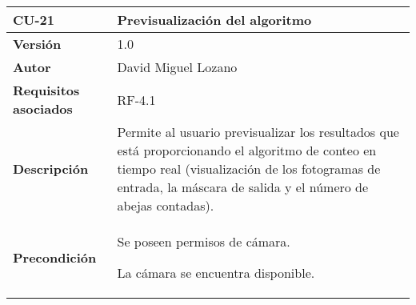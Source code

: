 \begin{longtable}[H]{@{}ll@{}}
\toprule
\begin{minipage}[b]{0.26\columnwidth}\raggedright\strut
\textbf{CU-21}\strut
\end{minipage} & \begin{minipage}[b]{0.68\columnwidth}\raggedright\strut
\textbf{Previsualización del algoritmo}\strut
\end{minipage}\tabularnewline
\midrule
\endhead
\begin{minipage}[t]{0.26\columnwidth}\raggedright\strut
\textbf{Versión}\strut
\end{minipage} & \begin{minipage}[t]{0.68\columnwidth}\raggedright\strut
1.0\strut
\end{minipage}\tabularnewline
\begin{minipage}[t]{0.26\columnwidth}\raggedright\strut
\textbf{Autor}\strut
\end{minipage} & \begin{minipage}[t]{0.68\columnwidth}\raggedright\strut
David Miguel Lozano\strut
\end{minipage}\tabularnewline
\begin{minipage}[t]{0.26\columnwidth}\raggedright\strut
\textbf{Requisitos asociados}\strut
\end{minipage} & \begin{minipage}[t]{0.68\columnwidth}\raggedright\strut
RF-4.1\strut
\end{minipage}\tabularnewline
\begin{minipage}[t]{0.26\columnwidth}\raggedright\strut
\textbf{Descripción}\strut
\end{minipage} & \begin{minipage}[t]{0.68\columnwidth}\raggedright\strut
Permite al usuario previsualizar los resultados que está proporcionando
el algoritmo de conteo en tiempo real (visualización de los fotogramas
de entrada, la máscara de salida y el número de abejas contadas).\strut
\end{minipage}\tabularnewline
\begin{minipage}[t]{0.26\columnwidth}\raggedright\strut
\textbf{Precondición}\strut
\end{minipage} & \begin{minipage}[t]{0.68\columnwidth}\raggedright\strut
Se poseen permisos de cámara.

La cámara se encuentra disponible.


\end{minipage}
\end{longtable}
